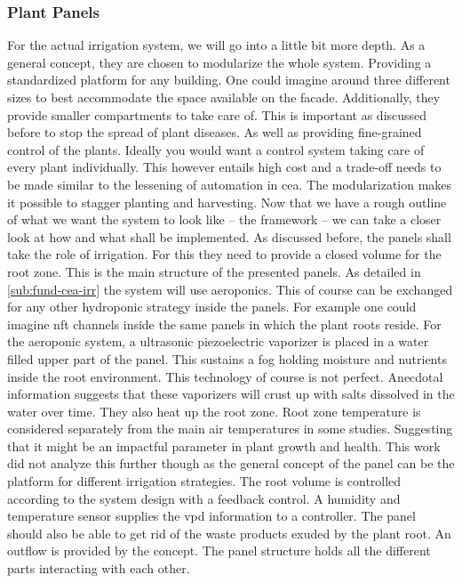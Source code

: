 \subsubsection{Plant Panels}
For the actual irrigation system, we will go into a little bit more depth.
As a general concept, they are chosen to modularize the whole system.
Providing a standardized platform for any building.
One could imagine around three different sizes to best accommodate the space available on the facade.
Additionally, they provide smaller compartments to take care of.
This is important as discussed before to stop the spread of plant diseases.
As well as providing fine-grained control of the plants.
Ideally you would want a control system taking care of every plant individually.
This however entails high cost and a trade-off needs to be made similar to the lessening of automation in \ac{cea}.
The modularization makes it possible to stagger planting and harvesting.
Now that we have a rough outline of what we want the system to look like -- the framework -- we can take a closer look at how and what shall be implemented.
As discussed before, the panels shall take the role of irrigation.
For this they need to provide a closed volume for the root zone.
This is the main structure of the presented panels.
As detailed in \ref{sub:fund-cea-irr} the system will use aeroponics.
This of course can be exchanged for any other hydroponic strategy inside the panels.
For example one could imagine \ac{nft} channels inside the same panels in which the plant roots reside.
For the aeroponic system, a ultrasonic piezoelectric vaporizer is placed in a water filled upper part of the panel.
This sustains a fog holding moisture and nutrients inside the root environment.
This technology of course is not perfect.
Anecdotal information suggests that these vaporizers will crust up with salts dissolved in the water over time.
They also heat up the root zone.
Root zone temperature is considered separately from the main air temperatures in some studies.
Suggesting that it might be an impactful parameter in plant growth and health.
This work did not analyze this further though as the general concept of the panel can be the platform for different irrigation strategies.
The root volume is controlled according to the system design with a feedback control.
A humidity and temperature sensor supplies the \ac{vpd} information to a controller.
The panel should also be able to get rid of the waste products exuded by the plant root.
An outflow is provided by the concept.
The panel structure holds all the different parts interacting with each other.
